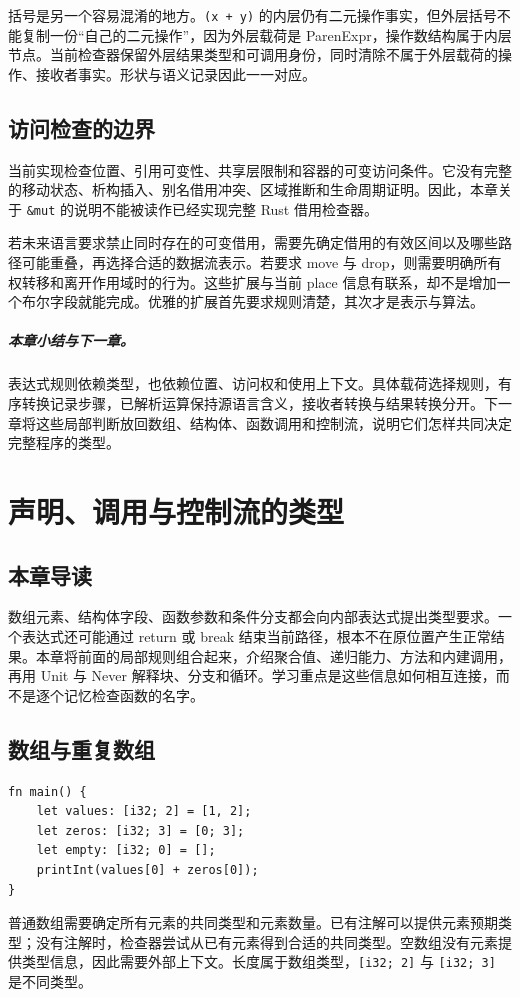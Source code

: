 括号是另一个容易混淆的地方。\lstinline[language=Rustless]|(x + y)| 的内层仍有二元操作事实，但外层括号不能复制一份“自己的二元操作”，因为外层载荷是 ParenExpr，操作数结构属于内层节点。当前检查器保留外层结果类型和可调用身份，同时清除不属于外层载荷的操作、接收者事实。形状与语义记录因此一一对应。

\section{访问检查的边界}
当前实现检查位置、引用可变性、共享层限制和容器的可变访问条件。它没有完整的移动状态、析构插入、别名借用冲突、区域推断和生命周期证明。因此，本章关于 \lstinline[language=Rustless]|&mut| 的说明不能被读作已经实现完整 Rust 借用检查器。

若未来语言要求禁止同时存在的可变借用，需要先确定借用的有效区间以及哪些路径可能重叠，再选择合适的数据流表示。若要求 move 与 drop，则需要明确所有权转移和离开作用域时的行为。这些扩展与当前 place 信息有联系，却不是增加一个布尔字段就能完成。优雅的扩展首先要求规则清楚，其次才是表示与算法。

\paragraph{本章小结与下一章。}
表达式规则依赖类型，也依赖位置、访问权和使用上下文。具体载荷选择规则，有序转换记录步骤，已解析运算保持源语言含义，接收者转换与结果转换分开。下一章将这些局部判断放回数组、结构体、函数调用和控制流，说明它们怎样共同决定完整程序的类型。

\chapter{声明、调用与控制流的类型}
\label{chap:semantic-control}
\section*{本章导读}
数组元素、结构体字段、函数参数和条件分支都会向内部表达式提出类型要求。一个表达式还可能通过 return 或 break 结束当前路径，根本不在原位置产生正常结果。本章将前面的局部规则组合起来，介绍聚合值、递归能力、方法和内建调用，再用 Unit 与 Never 解释块、分支和循环。学习重点是这些信息如何相互连接，而不是逐个记忆检查函数的名字。

\section{数组与重复数组}
\begin{lstlisting}[language=Rustless]
fn main() {
    let values: [i32; 2] = [1, 2];
    let zeros: [i32; 3] = [0; 3];
    let empty: [i32; 0] = [];
    printInt(values[0] + zeros[0]);
}
\end{lstlisting}
普通数组需要确定所有元素的共同类型和元素数量。已有注解可以提供元素预期类型；没有注解时，检查器尝试从已有元素得到合适的共同类型。空数组没有元素提供类型信息，因此需要外部上下文。长度属于数组类型，\lstinline[language=Rustless]|[i32; 2]| 与 \lstinline[language=Rustless]|[i32; 3]| 是不同类型。

